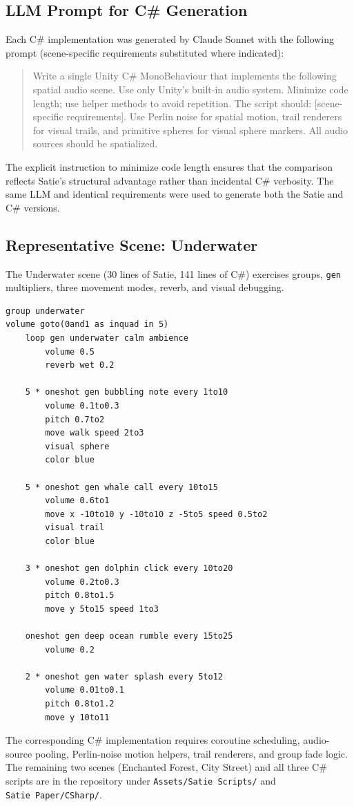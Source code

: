 \documentclass[sigconf,anonymous,review]{nimeart}
\begin{document}
\subsection{LLM Prompt for C\# Generation}

Each C\# implementation was generated by Claude Sonnet with the following prompt (scene-specific requirements substituted where indicated):

\begin{quote}
\small
Write a single Unity C\# MonoBehaviour that implements the following spatial audio scene. Use only Unity's built-in audio system. Minimize code length; use helper methods to avoid repetition. The script should: [scene-specific requirements]. Use Perlin noise for spatial motion, trail renderers for visual trails, and primitive spheres for visual sphere markers. All audio sources should be spatialized.
\end{quote}

The explicit instruction to minimize code length ensures that the comparison reflects Satie's structural advantage rather than incidental C\# verbosity. The same LLM and identical requirements were used to generate both the Satie and C\# versions.

\subsection{Representative Scene: Underwater}

The Underwater scene (30 lines of Satie, 141 lines of C\#) exercises groups, \texttt{gen} multipliers, three movement modes, reverb, and visual debugging.

\begin{lstlisting}[language=satie,basicstyle=\ttfamily\scriptsize]
group underwater
volume goto(0and1 as inquad in 5)
    loop gen underwater calm ambience
        volume 0.5
        reverb wet 0.2

    5 * oneshot gen bubbling note every 1to10
        volume 0.1to0.3
        pitch 0.7to2
        move walk speed 2to3
        visual sphere
        color blue

    5 * oneshot gen whale call every 10to15
        volume 0.6to1
        move x -10to10 y -10to10 z -5to5 speed 0.5to2
        visual trail
        color blue

    3 * oneshot gen dolphin click every 10to20
        volume 0.2to0.3
        pitch 0.8to1.5
        move y 5to15 speed 1to3

    oneshot gen deep ocean rumble every 15to25
        volume 0.2

    2 * oneshot gen water splash every 5to12
        volume 0.01to0.1
        pitch 0.8to1.2
        move y 10to11
\end{lstlisting}

The corresponding C\# implementation requires coroutine scheduling, audio-source pooling, Perlin-noise motion helpers, trail renderers, and group fade logic. The remaining two scenes (Enchanted Forest, City Street) and all three C\# scripts are in the repository under \texttt{Assets/Satie~Scripts/} and \texttt{Satie~Paper/CSharp/}.
\end{document}
